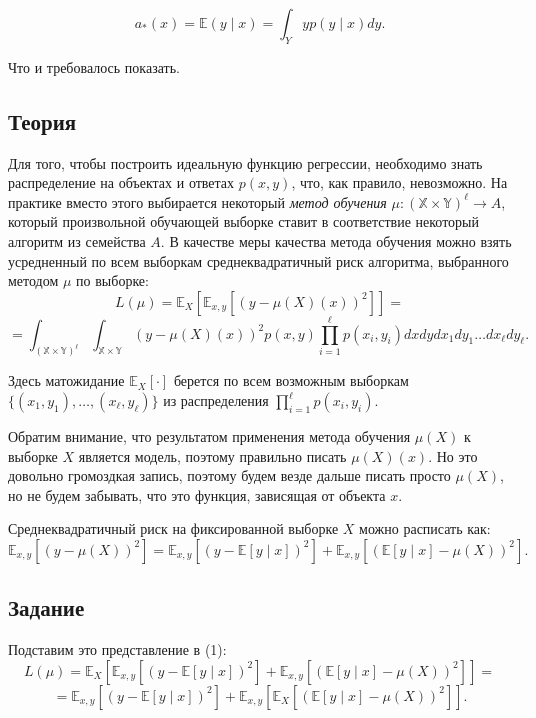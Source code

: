 \[
a_*(x) = \mathbb{E}(y \mid x) = \int_Y y p(y \mid x) dy.
\]

Что и требовалось показать.


\subsection*{Теория}

Для того, чтобы построить идеальную функцию регрессии, необходимо знать распределение на объектах и ответах $p(x, y)$, что, как правило, невозможно. На практике вместо этого выбирается некоторый \emph{метод обучения} $\mu : (\mathbb{X} \times \mathbb{Y})^\ell \to A$, который произвольной обучающей выборке ставит в соответствие некоторый алгоритм из семейства $A$. В качестве меры качества метода обучения можно взять усредненный по всем выборкам среднеквадратичный риск алгоритма, выбранного методом $\mu$ по выборке:
\newpage
\[
    L(\mu) = \mathbb{E}_X \left[ \mathbb{E}_{x, y} \left[ \left( y - \mu(X)(x) \right)^2 \right] \right] = \tag{1}
\]
\[
    =\int_{(\mathbb{X} \times \mathbb{Y})^\ell} \int_{\mathbb{X} \times \mathbb{Y}} (y - \mu(X)(x))^2
    p(x, y) \prod_{i=1}^\ell p(x_i, y_i) dx dy dx_1 dy_1 \ldots dx_\ell dy_\ell.
\]

Здесь матожидание $\mathbb{E}_X[\cdot]$ берется по всем возможным выборкам $\{(x_1, y_1), \ldots, (x_\ell, y_\ell)\}$ из распределения $\prod_{i=1}^\ell p(x_i, y_i)$.

Обратим внимание, что результатом применения метода обучения $\mu(X)$ к выборке $X$ является модель, поэтому правильно писать $\mu(X)(x)$. Но это довольно громоздкая запись, поэтому будем везде дальше писать просто $\mu(X)$, но не будем забывать, что это функция, зависящая от объекта $x$.

Среднеквадратичный риск на фиксированной выборке $X$ можно расписать как:
\[
\mathbb{E}_{x, y} \left[ \left( y - \mu(X) \right)^2 \right] =
\mathbb{E}_{x, y} \left[ \left( y - \mathbb{E}[y \mid x] \right)^2 \right] +
\mathbb{E}_{x, y} \left[ \left( \mathbb{E}[y \mid x] - \mu(X) \right)^2 \right].
\]

\subsection*{Задание}

Подставим это представление в (1):
\[
L(\mu) = \mathbb{E}_X \left[ \mathbb{E}_{x,y} \left[ \left( y - \mathbb{E}[y \mid x] \right)^2 \right]
+ \mathbb{E}_{x,y} \left[ \left( \mathbb{E}[y \mid x] - \mu(X) \right)^2 \right] \right] =
\]
\[
= \mathbb{E}_{x,y} \left[ \left( y - \mathbb{E}[y \mid x] \right)^2 \right]
+ \mathbb{E}_{x,y} \left[ \mathbb{E}_X \left[ \left( \mathbb{E}[y \mid x] - \mu(X) \right)^2 \right] \right]. \tag{2}
\]

